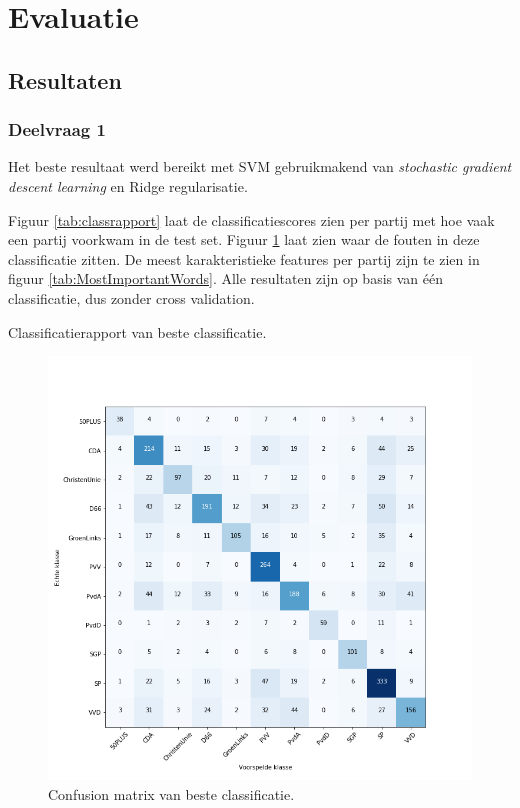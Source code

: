 \section{Evaluatie}
\label{sec:eva}

\subsection{Resultaten}

\subsubsection{Deelvraag 1}
Het beste resultaat werd bereikt met SVM gebruikmakend van \textit{stochastic gradient descent learning} en Ridge regularisatie.\par
Figuur \ref{tab:classrapport} laat de classificatiescores zien per partij met hoe vaak een partij voorkwam in de test set. Figuur \ref{fig:confusionmatrix} laat zien waar de fouten in deze classificatie zitten. De meest karakteristieke features per partij zijn te zien in figuur \ref{tab:MostImportantWords}. Alle resultaten zijn op basis van één classificatie, dus zonder cross validation.

\begin{table}[H]
\caption{Classificatierapport van beste classificatie.}
\label{tab:classrapport}
\centering

\end{table}


\begin{figure}[H]
  \centering
    \includegraphics[width=0.60\paperwidth]{Verslag/Tables/confusionmatrix.png}
\caption{Confusion matrix van beste classificatie.}
\label{fig:confusionmatrix}
\end{figure}

